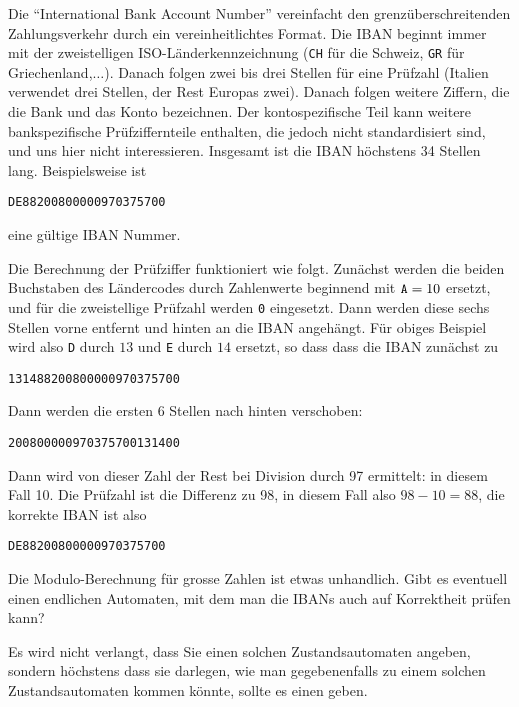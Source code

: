 Die ``International Bank Account Number'' vereinfacht den
grenzüberschreitenden Zahlungsverkehr durch ein vereinheitlichtes
Format. Die IBAN beginnt immer mit der zweistelligen ISO-Länderkennzeichnung
({\tt CH} für die Schweiz, {\tt GR} für Griechenland,$\dots$). Danach
folgen zwei bis drei Stellen für eine Prüfzahl (Italien verwendet
drei Stellen, der Rest Europas zwei).
Danach folgen weitere Ziffern, die die Bank und das Konto bezeichnen.
Der kontospezifische Teil kann weitere bankspezifische Prüfziffernteile
enthalten, die jedoch nicht standardisiert sind, und uns hier nicht
interessieren.
Insgesamt ist die IBAN höchstens 34 Stellen lang.
Beispielsweise ist
\begin{center}
{\tt DE88200800000970375700}
\end{center}
eine gültige IBAN Nummer.

Die Berechnung der Prüfziffer funktioniert wie folgt.
Zunächst
werden die beiden Buchstaben des Ländercodes durch Zahlenwerte
beginnend mit $\text{\tt A}=10$ ersetzt, und für die zweistellige
Prüfzahl werden {\tt 0} eingesetzt. Dann werden diese sechs Stellen
vorne entfernt und hinten an die IBAN angehängt. Für obiges Beispiel
wird also {\tt D} durch $13$ und {\tt E} durch $14$ ersetzt, so dass dass die 
IBAN zunächst zu
\begin{center}
{\tt 131488200800000970375700}
\end{center}
Dann werden die ersten 6 Stellen nach hinten verschoben:
\begin{center}
{\tt 200800000970375700131400}
\end{center}
Dann wird von dieser Zahl der Rest bei Division durch 97 ermittelt:
in diesem Fall 10. Die Prüfzahl ist die Differenz zu 98, in diesem
Fall also $98-10=88$, die korrekte IBAN ist also
\begin{center}
{\tt DE88200800000970375700}
\end{center}

Die Modulo-Berechnung für grosse Zahlen ist etwas unhandlich.
Gibt es eventuell einen endlichen Automaten, mit dem man die IBANs
auch auf Korrektheit prüfen kann?

\begin{hinweis}
Es wird nicht verlangt, dass Sie einen solchen Zustandsautomaten angeben,
sondern höchstens dass sie darlegen, wie man gegebenenfalls zu einem solchen
Zustandsautomaten kommen könnte, sollte es einen geben.
\end{hinweis}

